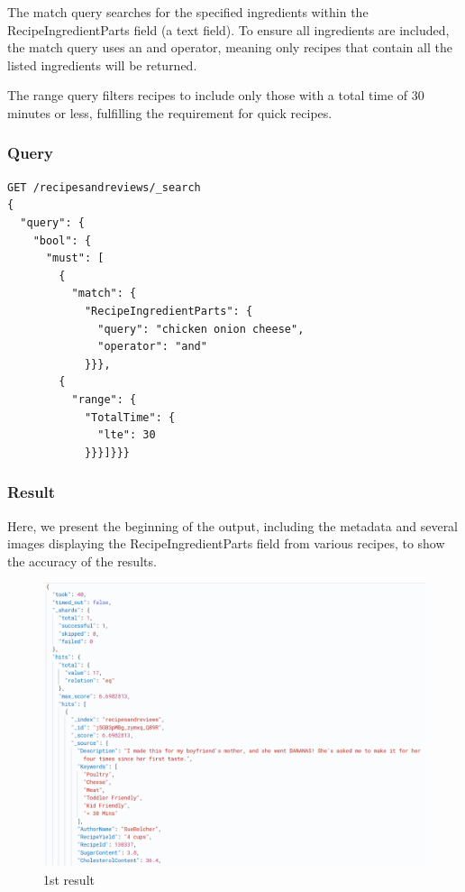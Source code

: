 \begin{enumerate}
    The match query searches for the specified ingredients within the RecipeIngredientParts field (a text field). To ensure all ingredients are included, the match query uses an and operator, meaning only recipes that contain all the listed ingredients will be returned.
    
    The range query filters recipes to include only those with a total time of 30 minutes or less, fulfilling the requirement for quick recipes.
    \subsubsection{Query}
    \begin{verbatim}
GET /recipesandreviews/_search
{
  "query": {
    "bool": {
      "must": [
        {
          "match": {
            "RecipeIngredientParts": {
              "query": "chicken onion cheese",
              "operator": "and"
            }}},
        {
          "range": {
            "TotalTime": {
              "lte": 30
            }}}]}}}
    \end{verbatim}

    \subsubsection{Result}
    Here, we present the beginning of the output, including the metadata and several images displaying the RecipeIngredientParts field from various recipes, to show the accuracy of the results.
    \begin{figure}[H]
    \centering
    \includegraphics[width=0.9\linewidth]{Report/ReportLatex/Images/ElasticsearchResults/ingredients1.png}
    \caption{1st result}
    \label{fig:enter-label}
    \end{figure}


\end{enumerate}
